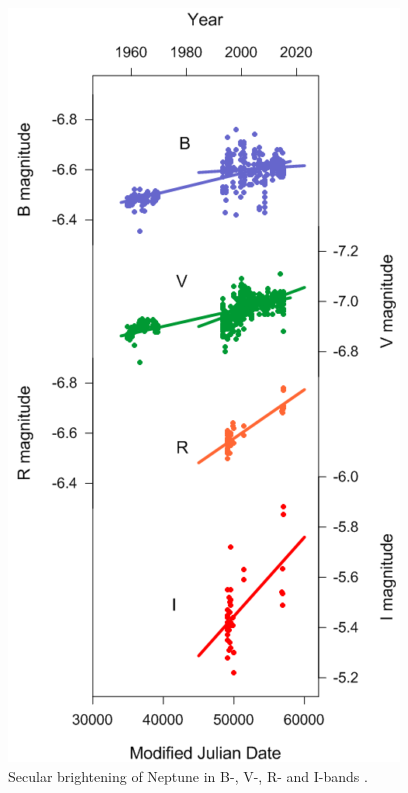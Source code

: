 \documentclass[12pt,a4paper]{report}
\begin{document}
\begin{figure}[H]
\centering
\includegraphics[scale=1]{Neptune_secular.png}
\caption{Secular brightening of Neptune in B-, V-, R- and I-bands \citep{Schmude2016}. \label{Fig:netuno-secular}}
\end{figure}
\end{document}
